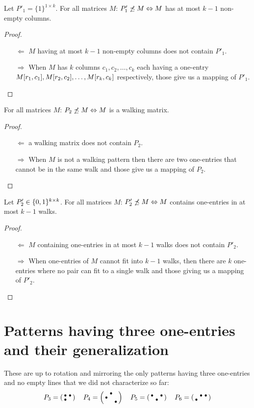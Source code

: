 \begin{prop}
Let $P'_1=\{1\}^{1\times k}$. For all matrices $M$: $P'_1\not\preceq M\Leftrightarrow M$ has at most $k-1$ non-empty columns.
\end{prop}
\begin{proof}
\begin{itemize}
	\item[$\Leftarrow$] $M$ having at most $k-1$ non-empty columns does not contain $P'_1$.
	\item[$\Rightarrow$] When $M$ has $k$ columns $c_1,c_2,\dots,c_k$ each having a one-entry $M[r_1,c_1],\\M[r_2,c_2],\dots,M[r_k,c_k]$ respectively, those give us a mapping of $P'_1$.
\end{itemize}
\end{proof}

\begin{prop}
\label{prop:walking}
For all matrices $M$: $P_2\not\preceq M\Leftrightarrow M$ is a walking matrix.
\end{prop}
\begin{proof}
\begin{itemize}
	\item[$\Leftarrow$] a walking matrix does not contain $P_2$.
	\item[$\Rightarrow$] When $M$ is not a walking pattern then there are two one-entries that cannot be in the same walk and those give us a mapping of $P_2$.
\end{itemize}
\end{proof}

\begin{prop}
Let $P'_2\in\{0,1\}^{k\times k}$. For all matrices $M$: $P'_2\not\preceq M\Leftrightarrow M$ contains one-entries in at most $k-1$ walks.
\end{prop}
\begin{proof}
\begin{itemize}
	\item[$\Leftarrow$] $M$ containing one-entries in at most $k-1$ walks does not contain $P'_2$.
	\item[$\Rightarrow$] When one-entries of $M$ cannot fit into $k-1$ walks, then there are $k$ one-entries where no pair can fit to a single walk and those giving us a mapping of $P'_2$.
\end{itemize}
\end{proof}

\section{Patterns having three one-entries and their generalization}
\label{sec:3ones}
These are up to rotation and mirroring the only patterns having three one-entries and no empty lines that we did not characterize so far:
$$P_3=\left(\begin{smallmatrix}\bullet&\bullet\\\bullet& \end{smallmatrix}\right)\ \ \ P_4=\left(\begin{smallmatrix} &\bullet& \\\bullet& & \\ & &\bullet\end{smallmatrix}\right)\ \ \ P_5=\left(\begin{smallmatrix}\bullet& &\bullet\\ &\bullet& \end{smallmatrix}\right)\ \ \ P_6=\left(\begin{smallmatrix} &\bullet&\bullet\\\bullet& & \end{smallmatrix}\right)$$

